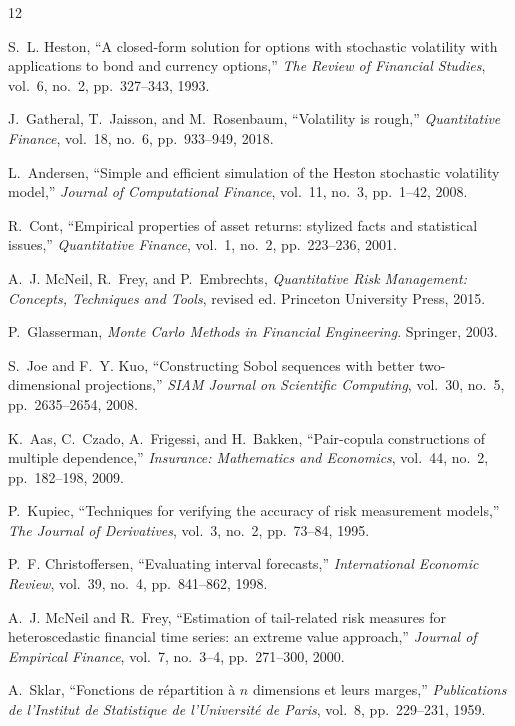 \documentclass[11pt,a4paper]{article}
\begin{document}
\begin{thebibliography}{12}

S.~L. Heston, ``A closed-form solution for options with stochastic volatility with applications to bond and currency options,'' \textit{The Review of Financial Studies}, vol.~6, no.~2, pp.~327--343, 1993.

J.~Gatheral, T.~Jaisson, and M.~Rosenbaum, ``Volatility is rough,'' \textit{Quantitative Finance}, vol.~18, no.~6, pp.~933--949, 2018.

L.~Andersen, ``Simple and efficient simulation of the Heston stochastic volatility model,'' \textit{Journal of Computational Finance}, vol.~11, no.~3, pp.~1--42, 2008.

R.~Cont, ``Empirical properties of asset returns: stylized facts and statistical issues,'' \textit{Quantitative Finance}, vol.~1, no.~2, pp.~223--236, 2001.

A.~J. McNeil, R.~Frey, and P.~Embrechts, \textit{Quantitative Risk Management: Concepts, Techniques and Tools}, revised ed. Princeton University Press, 2015.

P.~Glasserman, \textit{Monte Carlo Methods in Financial Engineering}. Springer, 2003.

S.~Joe and F.~Y. Kuo, ``Constructing Sobol sequences with better two-dimensional projections,'' \textit{SIAM Journal on Scientific Computing}, vol.~30, no.~5, pp.~2635--2654, 2008.

K.~Aas, C.~Czado, A.~Frigessi, and H.~Bakken, ``Pair-copula constructions of multiple dependence,'' \textit{Insurance: Mathematics and Economics}, vol.~44, no.~2, pp.~182--198, 2009.

P.~Kupiec, ``Techniques for verifying the accuracy of risk measurement models,'' \textit{The Journal of Derivatives}, vol.~3, no.~2, pp.~73--84, 1995.

P.~F. Christoffersen, ``Evaluating interval forecasts,'' \textit{International Economic Review}, vol.~39, no.~4, pp.~841--862, 1998.

A.~J. McNeil and R.~Frey, ``Estimation of tail-related risk measures for heteroscedastic financial time series: an extreme value approach,'' \textit{Journal of Empirical Finance}, vol.~7, no.~3--4, pp.~271--300, 2000.

A.~Sklar, ``Fonctions de r\'{e}partition \`{a} $n$ dimensions et leurs marges,'' \textit{Publications de l'Institut de Statistique de l'Universit\'{e} de Paris}, vol.~8, pp.~229--231, 1959.

\end{thebibliography}
\end{document}
